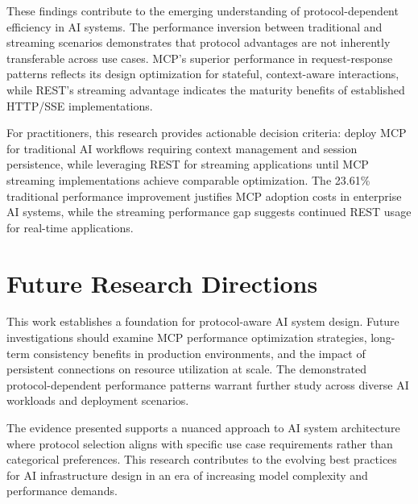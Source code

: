 These findings contribute to the emerging understanding of protocol-dependent efficiency in AI systems. The performance inversion between traditional and streaming scenarios demonstrates that protocol advantages are not inherently transferable across use cases. MCP's superior performance in request-response patterns reflects its design optimization for stateful, context-aware interactions, while REST's streaming advantage indicates the maturity benefits of established HTTP/SSE implementations.

For practitioners, this research provides actionable decision criteria: deploy MCP for traditional AI workflows requiring context management and session persistence, while leveraging REST for streaming applications until MCP streaming implementations achieve comparable optimization. The 23.61\% traditional performance improvement justifies MCP adoption costs in enterprise AI systems, while the streaming performance gap suggests continued REST usage for real-time applications.

\section{Future Research Directions}

This work establishes a foundation for protocol-aware AI system design. Future investigations should examine MCP performance optimization strategies, long-term consistency benefits in production environments, and the impact of persistent connections on resource utilization at scale. The demonstrated protocol-dependent performance patterns warrant further study across diverse AI workloads and deployment scenarios.

The evidence presented supports a nuanced approach to AI system architecture where protocol selection aligns with specific use case requirements rather than categorical preferences. This research contributes to the evolving best practices for AI infrastructure design in an era of increasing model complexity and performance demands.
